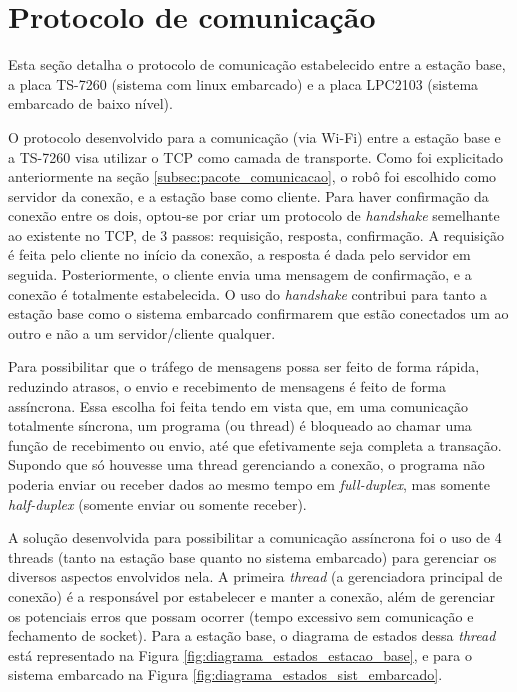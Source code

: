 

\section{Protocolo de comunicação}

Esta seção detalha o protocolo de comunicação estabelecido entre a estação base, a placa TS-7260 (sistema com linux embarcado) e a placa LPC2103 (sistema embarcado de baixo nível).

O protocolo desenvolvido para a comunicação (via Wi-Fi) entre a estação base e a TS-7260 visa utilizar o TCP como camada de transporte. Como foi explicitado anteriormente na seção \ref{subsec:pacote_comunicacao}, o robô foi escolhido como servidor da conexão, e a estação base como cliente. Para haver confirmação da conexão entre os dois, optou-se por criar um protocolo de \textit{handshake} semelhante ao existente no TCP, de 3 passos: requisição, resposta, confirmação. A requisição é feita pelo cliente no início da conexão, a resposta é dada pelo servidor em seguida. Posteriormente, o cliente envia uma mensagem de confirmação, e a conexão é totalmente estabelecida. O uso do \textit{handshake} contribui para tanto a estação base como o sistema embarcado confirmarem que estão conectados um ao outro e não a um servidor/cliente qualquer.

Para possibilitar que o tráfego de mensagens possa ser feito de forma rápida, reduzindo atrasos, o envio e recebimento de mensagens é feito de forma assíncrona.
Essa escolha foi feita tendo em vista que, em uma comunicação totalmente síncrona, um programa (ou thread) é bloqueado ao chamar uma função de recebimento ou envio, até que efetivamente seja completa a transação. Supondo que só houvesse uma thread gerenciando a conexão, o programa não poderia enviar ou receber dados ao mesmo tempo em \textit{full-duplex}, mas somente \textit{half-duplex} (somente enviar ou somente receber).

A solução desenvolvida para possibilitar a comunicação assíncrona foi o uso de 4 threads (tanto na estação base quanto no sistema embarcado) para gerenciar os diversos aspectos envolvidos nela. A primeira \textit{thread} (a gerenciadora principal de conexão) é a responsável por estabelecer e manter a conexão, além de gerenciar os potenciais erros que possam ocorrer (tempo excessivo sem comunicação e fechamento de socket). Para a estação base, o diagrama de estados dessa \textit{thread} está representado na Figura \ref{fig:diagrama_estados_estacao_base}, e para o sistema embarcado na Figura \ref{fig:diagrama_estados_sist_embarcado}.

